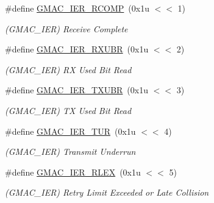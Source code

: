 \begin{DoxyCompactItemize}
\mbox{\label{group__SAMV71__GMAC_ga377a5741783b964bffd1ecafe4d723e8}} 
\#define \mbox{\hyperlink{group__SAMV71__GMAC_ga377a5741783b964bffd1ecafe4d723e8}{G\+M\+A\+C\+\_\+\+I\+E\+R\+\_\+\+R\+C\+O\+MP}}~(0x1u $<$$<$ 1)
\begin{DoxyCompactList}\small\item\em (G\+M\+A\+C\+\_\+\+I\+ER) Receive Complete \end{DoxyCompactList}\item 
\mbox{\label{group__SAMV71__GMAC_gad88b2a426077596643df370fc9d7b03b}} 
\#define \mbox{\hyperlink{group__SAMV71__GMAC_gad88b2a426077596643df370fc9d7b03b}{G\+M\+A\+C\+\_\+\+I\+E\+R\+\_\+\+R\+X\+U\+BR}}~(0x1u $<$$<$ 2)
\begin{DoxyCompactList}\small\item\em (G\+M\+A\+C\+\_\+\+I\+ER) RX Used Bit Read \end{DoxyCompactList}\item 
\mbox{\label{group__SAMV71__GMAC_gaff927dc345830a36276530ae3fdefadf}} 
\#define \mbox{\hyperlink{group__SAMV71__GMAC_gaff927dc345830a36276530ae3fdefadf}{G\+M\+A\+C\+\_\+\+I\+E\+R\+\_\+\+T\+X\+U\+BR}}~(0x1u $<$$<$ 3)
\begin{DoxyCompactList}\small\item\em (G\+M\+A\+C\+\_\+\+I\+ER) TX Used Bit Read \end{DoxyCompactList}\item 
\mbox{\label{group__SAMV71__GMAC_gade1836f08515e2522b57d6fb10e112ef}} 
\#define \mbox{\hyperlink{group__SAMV71__GMAC_gade1836f08515e2522b57d6fb10e112ef}{G\+M\+A\+C\+\_\+\+I\+E\+R\+\_\+\+T\+UR}}~(0x1u $<$$<$ 4)
\begin{DoxyCompactList}\small\item\em (G\+M\+A\+C\+\_\+\+I\+ER) Transmit Underrun \end{DoxyCompactList}\item 
\mbox{\label{group__SAMV71__GMAC_gac2c5e90843442f806fad3c378d52f924}} 
\#define \mbox{\hyperlink{group__SAMV71__GMAC_gac2c5e90843442f806fad3c378d52f924}{G\+M\+A\+C\+\_\+\+I\+E\+R\+\_\+\+R\+L\+EX}}~(0x1u $<$$<$ 5)
\begin{DoxyCompactList}\small\item\em (G\+M\+A\+C\+\_\+\+I\+ER) Retry Limit Exceeded or Late Collision \end{DoxyCompactList}\item 
$$
\end{DoxyCompactItemize}
